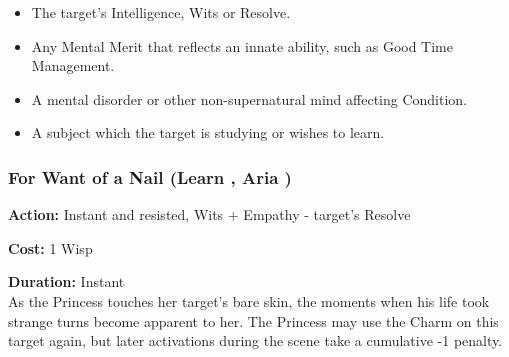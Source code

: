 \begin{itemize}
\item The target's Intelligence, Wits or Resolve.
\item Any Mental Merit that reflects an innate ability, such as Good Time Management.
\item A mental disorder or other non-supernatural mind affecting Condition. 
\item A subject which the target is studying or wishes to learn. 
\end{itemize}


\subsubsection*{For Want of a Nail (Learn \textbullet\textbullet, Aria \textbullet)}

\noindent \textbf{Action:} Instant and resisted, Wits + Empathy - target's Resolve

\noindent \textbf{Cost:} 1 Wisp

\noindent \textbf{Duration:} Instant\\

\noindent As the Princess touches her target's bare skin, the moments when his life took strange turns become apparent to her. The Princess may use the Charm on this target again, but later activations during the scene take a cumulative -1 penalty.

